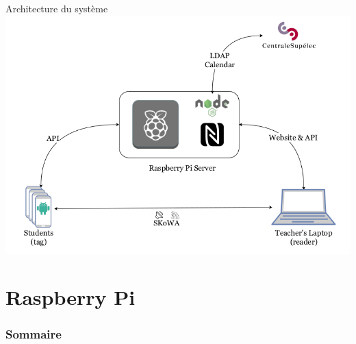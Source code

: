 \documentclass[aspectratio=169]{beamer}
\begin{document}
\begin{frame}{Architecture du système}
  \centering
  \includegraphics[height=0.8\textheight]{../assets/architecture.png}
\end{frame}


\section{Raspberry Pi}

\begin{frame}
    \frametitle{Sommaire}
    \tableofcontents[
      currentsection,
      sectionstyle=show/shaded,
      subsectionstyle=show/shaded/hide
    ]
\end{frame}
\end{document}
